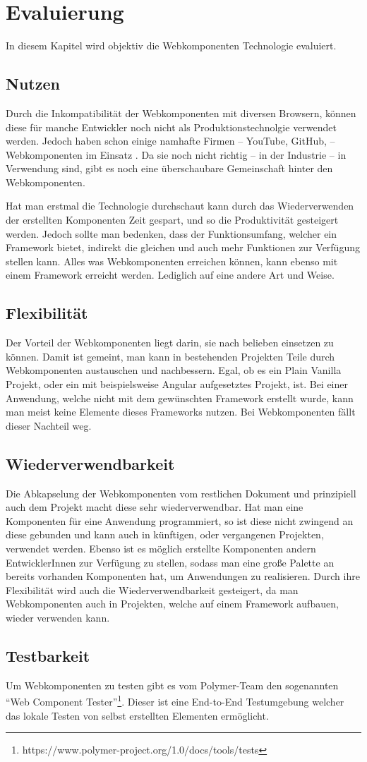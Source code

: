 \chapter{Evaluierung}
In diesem Kapitel wird objektiv die Webkomponenten Technologie evaluiert.

\section{Nutzen}
Durch die Inkompatibilität der Webkomponenten mit diversen Browsern, können diese für manche Entwickler noch nicht als Produktionstechnolgie verwendet werden. Jedoch haben schon einige namhafte Firmen -- YouTube, GitHub, \etc -- Webkomponenten im Einsatz \cite{webcomponents-production-use}. 
Da sie noch nicht richtig -- in der Industrie -- in Verwendung sind, gibt es noch eine überschaubare Gemeinschaft hinter den Webkomponenten. 

Hat man erstmal die Technologie durchschaut kann durch das Wiederverwenden der erstellten Komponenten Zeit gespart, und so die Produktivität gesteigert werden. Jedoch sollte man bedenken, dass der Funktionsumfang, welcher ein Framework bietet, indirekt die gleichen und auch mehr Funktionen zur Verfügung stellen kann. Alles was Webkomponenten erreichen können, kann ebenso mit einem Framework erreicht werden. Lediglich auf eine andere Art und Weise. 

\section{Flexibilität}
Der Vorteil der Webkomponenten liegt darin, sie nach belieben einsetzen zu können. Damit ist gemeint, man kann in bestehenden Projekten Teile durch Webkomponenten austauschen und nachbessern. Egal, ob es ein Plain Vanilla Projekt, oder ein mit beispielsweise Angular aufgesetztes Projekt, ist. Bei einer Anwendung, welche nicht mit dem gewünschten Framework erstellt wurde, kann man meist keine Elemente dieses Frameworks nutzen. Bei Webkomponenten fällt dieser Nachteil weg.

\section{Wiederverwendbarkeit}
Die Abkapselung der Webkomponenten vom restlichen Dokument und prinzipiell auch dem Projekt macht diese sehr wiederverwendbar. Hat man eine Komponenten für eine Anwendung programmiert, so ist diese nicht zwingend an diese gebunden und kann auch in künftigen, oder vergangenen Projekten, verwendet werden. Ebenso ist es möglich erstellte Komponenten andern EntwicklerInnen zur Verfügung zu stellen, sodass man eine große Palette an bereits vorhanden Komponenten hat, um Anwendungen zu realisieren. Durch ihre Flexibilität wird auch die Wiederverwendbarkeit gesteigert, da man Webkomponenten auch in Projekten, welche auf einem Framework aufbauen, wieder verwenden kann. 

\section{Testbarkeit}
Um Webkomponenten zu testen gibt es vom Polymer-Team den sogenannten "`Web Component Tester"'\footnote{https://www.polymer-project.org/1.0/docs/tools/tests}. Dieser ist eine End-to-End Testumgebung welcher das lokale Testen von selbst erstellten Elementen ermöglicht.